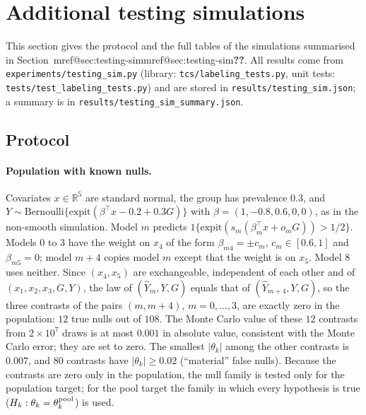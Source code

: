 \documentclass[pdflatex,sn-mathphys-num,iicol]{sn-jnl}
\makeatletter
\theoremstyle{thmstyleone}
\theoremstyle{thmstyletwo}
\theoremstyle{thmstylethree}
\newcommand{\Mref}[1]{\ifcsname mref@#1\endcsname\csname mref@#1\endcsname\else\textbf{??}\fi}
\makeatother
\begin{document}
\section{Additional testing simulations}\label{si:testing-sim}

This section gives the protocol and the full tables of the simulations summarised in Section~\Mref{sec:testing-sim}. All results come from \texttt{experiments/testing\_sim.py} (library: \texttt{tcs/labeling\_tests.py}, unit tests: \texttt{tests/test\_labeling\_tests.py}) and are stored in \texttt{results/testing\_sim.json}; a summary is in \texttt{results/testing\_sim\_summary.json}.

\subsection{Protocol}

\paragraph{Population with known nulls.} Covariates $x\in\mathbb R^5$ are standard normal, the group has prevalence $0.3$, and $Y\sim\mathrm{Bernoulli}\{\mathrm{expit}(\beta^\top x-0.2+0.3G)\}$ with $\beta=(1,-0.8,0.6,0,0)$, as in the non-smooth simulation. Model $m$ predicts $1\{\mathrm{expit}(s_m(\beta_m^\top x+o_mG))>1/2\}$. Models $0$ to $3$ have the weight on $x_4$ of the form $\beta_{m4}=\pm c_m$, $c_m\in[0.6,1]$ and $\beta_{m5}=0$; model $m+4$ copies model $m$ except that the weight is on $x_5$. Model $8$ uses neither. Since $(x_4,x_5)$ are exchangeable, independent of each other and of $(x_1,x_2,x_3,G,Y)$, the law of $(\hat Y_m,Y,G)$ equals that of $(\hat Y_{m+4},Y,G)$, so the three contrasts of the pairs $(m,m+4)$, $m=0,\dots,3$, are exactly zero in the population: $12$ true nulls out of $108$. The Monte Carlo value of these $12$ contrasts from $2\times10^7$ draws is at most $0.001$ in absolute value, consistent with the Monte Carlo error; they are set to zero. The smallest $|\theta_k|$ among the other contrasts is $0.007$, and $80$ contrasts have $|\theta_k|\ge0.02$ (``material'' false nulls). Because the contrasts are zero only in the population, the null family is tested only for the population target; for the pool target the family in which every hypothesis is true ($H_k:\theta_k=\theta_k^{\rm pool}$) is used.
\end{document}
